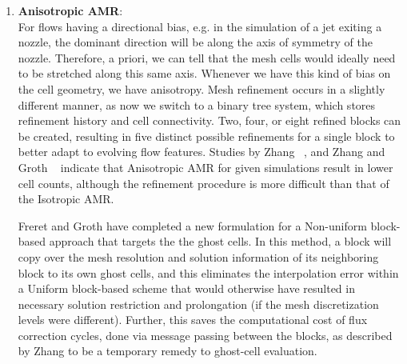 \begin{enumerate}
\item \textbf{Anisotropic AMR}: \\
For flows having a directional bias, e.g. in the simulation of a jet exiting a nozzle, the dominant direction will be along the axis of symmetry of the nozzle. Therefore, a priori, we can tell that the mesh cells would ideally need to be stretched along this same axis. Whenever we have this kind of bias on the cell geometry, we have anisotropy. Mesh refinement occurs in a slightly different manner, as now we switch to a binary tree system, which stores refinement history and cell connectivity. Two, four, or eight refined
blocks can be created, resulting in five distinct possible refinements for a single block to better adapt to evolving flow features. Studies by Zhang ~\cite{Zhang:2011b}, and Zhang and Groth ~\cite{Zhang:2011a} indicate that Anisotropic AMR for given simulations result in lower cell counts, although the refinement procedure is more difficult than that of the Isotropic AMR.\par
Freret and Groth \cite{Freret:2015} have completed a new formulation for a Non-uniform block-based approach that targets the the ghost cells. In this method, a block will copy over the mesh resolution and solution information of its neighboring block to its own ghost cells, and this eliminates the interpolation error within a Uniform block-based scheme that would otherwise have resulted in necessary solution restriction and prolongation (if the mesh discretization levels were different). Further, this saves the computational cost of flux correction cycles, done via message passing between the blocks, as described by Zhang to be a temporary remedy to ghost-cell evaluation.\cite{Zhang:2011a}

\end{enumerate}
